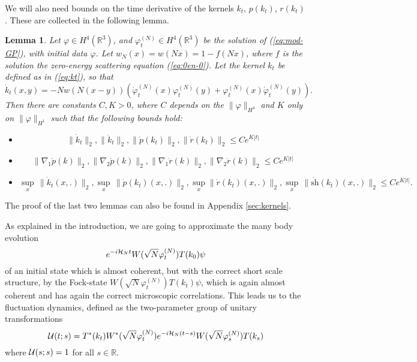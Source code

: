 \documentclass[11pt,a4paper]{article}
\newtheorem{lemma}[thm]{Lemma}
\newcommand{\cU}{{\cal U}}
\newcommand{\bR}{{\mathbb R}}
\newcommand{\cH}{{\cal H}}
\newcommand{\R}{\mathbb{R}}
\newcommand{\norm}[1]{\lVert#1\rVert}	%
\newcommand{\ph}{\varphi_t^{(N)}}	%
\begin{document}
We will also need bounds on the time derivative of the kernels $k_t$, $p(k_t)$, $r(k_t)$. These are collected in the following lemma.
\begin{lemma}\label{lm:dotk} 
Let $\varphi \in H^4(\R^3)$, and $\ph \in H^4 (\bR^3)$ be the solution of (\ref{eq:mod-GP}), with initial data $\varphi$. Let $w_N (x) = w(Nx) = 1 - f(Nx)$, where $f$ is the solution the zero-energy scattering equation (\ref{eq:0en-0}). Let the kernel $k_t$ be defined as in (\ref{eq:kt}), so that
\begin{equation}\label{eq:dtk} \dot{k}_t (x,y) = - N w (N (x-y)) \left( \dot{\varphi}_t^{(N)} (x) \varphi_t^{(N)} (y) + \varphi_t^{(N)} (x) \dot{\varphi}_t^{(N)} (y) \right). \end{equation}
Then there are constants $C,K >0$, where $C$ depends on the $\| \varphi \|_{H^4}$ and $K$ only on $\| \varphi \|_{H^1}$ such that the following bounds hold: 
\begin{itemize}
\item[(i)]   
 \[  \| \dot{k}_t \|_2 ,  \| \ddot k_t \|_2 , \| \dot{p} (k_t) \|_2 , \| \dot{r} (k_t) \|_2  \leq C e^{K|t|} \]
\item[(ii)] 
\[ \| \nabla_1 \dot p (k) \|_2 ,  \| \nabla_2 \dot p (k) \|_2 , \| \nabla_1 \dot r (k) \|_2,  \| \nabla_2 \dot r (k) \|_2  \leq C  e^{K|t|} \]
\item[(iii)] 
\[
\sup_x \, \norm{\dot k_t (x, .)}_{2} ,  \sup_x \, \norm{\dot p (k_t) (x, .)}_{2}, \sup_x \norm{\dot r (k_t) (x,.)}_{2}, \sup_x \, \| \dot{\text{sh}} (k_t) (x,.) \|_2  \leq C e^{K|t|}.
\] 
 \end{itemize}
 \end{lemma}
The proof of the last two lemmas can also be found in Appendix \ref{sec:kernels}. 

\bigskip

As explained in the introduction, we are going to approximate the many body evolution
\[ e^{-i \cH_N t} W(\sqrt{N} \ph ) T(k_0) \psi \]
of an initial state which is almost coherent, but with the correct short scale structure, by the Fock-state $W(\sqrt{N} \varphi_t^{(N)}) T(k_t) \psi$, which is again almost coherent and has again the correct microscopic correlations. This leads us to the fluctuation dynamics, defined as the two-parameter group of unitary transformations 
\begin{equation}\label{eq:cU} \cU (t;s) = T^* (k_t) W^* (\sqrt{N} \varphi_t^{(N)}) e^{-i\cH_N (t-s)} W(\sqrt{N} \varphi_s^{(N)}) T(k_s) \end{equation}
where $\cU (s;s) = 1$ for all $s \in \bR$. 
\end{document}
